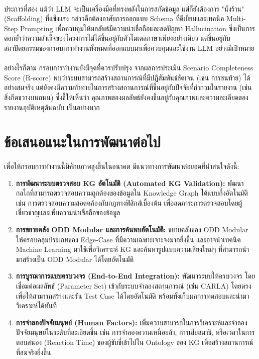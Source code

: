 \paragraph{}
ประการที่สอง แม้ว่า LLM จะเป็นเครื่องมือที่ทรงพลังในการสกัดข้อมูล แต่ก็ยังต้องการ "นั่งร้าน" (Scaffolding) ที่แข็งแรง กล่าวคือต้องอาศัยการออกแบบ Schema ที่ดีเยี่ยมและเทคนิค Multi-Step Prompting เพื่อควบคุมให้ผลลัพธ์มีความน่าเชื่อถือและลดปัญหา Hallucination ซึ่งเป็นการตอกย้ำว่าความสำเร็จของโครงการไม่ได้ขึ้นอยู่กับตัวโมเดลภาษาเพียงอย่างเดียว แต่ขึ้นอยู่กับสถาปัตยกรรมของกรอบการทำงานทั้งหมดที่ออกแบบมาเพื่อควบคุมและใช้งาน LLM อย่างมีเป้าหมาย

\paragraph{}
อย่างไรก็ตาม กรอบการทำงานยังมีจุดที่ควรปรับปรุง จากผลการประเมิน Scenario Completeness Score (R-score) พบว่าระบบสามารถสร้างสถานการณ์ที่มีปฏิสัมพันธ์ชัดเจน (เช่น การชนท้าย) ได้อย่างสมจริง แต่ยังคงมีความท้าทายในการสร้างสถานการณ์ที่ขึ้นอยู่กับปัจจัยที่กำกวมในรายงาน (เช่น สิ่งกีดขวางบนถนน) ซึ่งชี้ให้เห็นว่า คุณภาพของผลลัพธ์ยังคงขึ้นอยู่กับคุณภาพและความละเอียดของรายงานอุบัติเหตุต้นฉบับ เป็นอย่างมาก

\section{ข้อเสนอแนะในการพัฒนาต่อไป}
\paragraph{}
เพื่อให้กรอบการทำงานนี้มีศักยภาพสูงขึ้นในอนาคต มีแนวทางการพัฒนาต่อยอดที่น่าสนใจดังนี้:
\begin{enumerate}
    \item \textbf{การพัฒนาระบบตรวจสอบ KG อัตโนมัติ (Automated KG Validation):} พัฒนากลไกที่สามารถตรวจสอบความถูกต้องของข้อมูลใน Knowledge Graph ได้แบบกึ่งอัตโนมัติ เช่น การตรวจสอบความสอดคล้องกับกฎทางฟิสิกส์เบื้องต้น เพื่อลดภาระการตรวจสอบโดยผู้เชี่ยวชาญและเพิ่มความน่าเชื่อถือของข้อมูล
    \item \textbf{การขยายคลัง ODD Modular และการค้นพบอัตโนมัติ:} ขยายคลังของ ODD Modular ให้ครอบคลุมประเภทของ Edge-Case ที่มีความเฉพาะเจาะจงมากยิ่งขึ้น และอาจนำเทคนิค Machine Learning มาใช้เพื่อวิเคราะห์ KG และค้นหารูปแบบความเสี่ยงใหม่ๆ ที่สามารถนำมาสร้างเป็น ODD Modular ได้โดยอัตโนมัติ
    \item \textbf{การบูรณาการแบบครบวงจร (End-to-End Integration):} พัฒนาระบบให้ครบวงจร โดยเชื่อมต่อผลลัพธ์ (Parameter Set) เข้ากับระบบจำลองสถานการณ์ (เช่น CARLA) โดยตรง เพื่อให้สามารถสร้างและรัน Test Case ได้โดยอัตโนมัติ พร้อมทั้งเก็บผลการทดสอบและนำมาวิเคราะห์ได้ทันที
    \item \textbf{การจำลองปัจจัยมนุษย์ (Human Factors):} เพิ่มความสามารถในการวิเคราะห์และจำลองปัจจัยมนุษย์ในระดับที่ละเอียดขึ้น เช่น การจำลองความเหนื่อยล้า, การเสียสมาธิ, หรือเวลาในการตอบสนอง (Reaction Time) ของผู้ขับขี่เข้าไปใน Ontology ของ KG เพื่อสร้างสถานการณ์ที่สมจริงยิ่งขึ้น
\end{enumerate}


